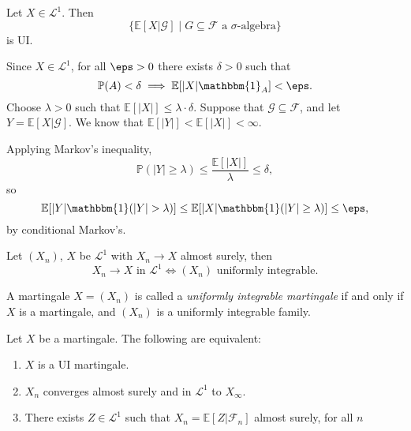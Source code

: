 \documentclass[12pt]{article}
\begin{document}
\begin{theorem}
	Let $X \in \mathcal{L}^1$. Then
	\[
		\{\mathbb{E}[X | \mathcal{G}] \mid G \subseteq \mathcal{F} \text{ a $\sigma$-algebra}\}
	\]
	is UI.
\end{theorem}

\begin{proofbox}
	Since $X \in \mathcal{L}^1$, for all $\eps > 0$ there exists $\delta > 0$ such that
	\[
	\mathbb{P}(A) < \delta \implies \mathbb{E}[|X| \mathbbm{1}_{A}] < \eps.
	\]
	Choose $\lambda > 0$ such that $\mathbb{E}[|X|] \leq \lambda \cdot \delta$. Suppose that $\mathcal{G} \subseteq \mathcal{F}$, and let $Y = \mathbb{E}[X|\mathcal{G}]$. We know that $\mathbb{E}[|Y|] < \mathbb{E}[|X|] < \infty$.

	Applying Markov's inequality,
	\[
	\mathbb{P}(|Y| \geq \lambda) \leq \frac{\mathbb{E}[|X|]}{\lambda} \leq \delta,
	\]
	so
	\[
	\mathbb{E}[|Y| \mathbbm{1}(|Y| > \lambda)] \leq \mathbb{E}[|X| \mathbbm{1}(|Y| \geq \lambda)] \leq \eps,
	\]
	by conditional Markov's.
\end{proofbox}


\begin{lemma}
	Let $(X_n)$, $X$ be $\mathcal{L}^1$ with $X_n \to X$ almost surely, then
	\[
		X_n \to X \text{ in } \mathcal{L^1} \iff (X_n) \text{ uniformly integrable}.
	\]
\end{lemma}

\begin{definition}
	A martingale $X = (X_n)$ is called a \emph{uniformly integrable martingale} if and only if $X$ is a martingale, and $(X_n)$ is a uniformly integrable family.
\end{definition}

\begin{theorem}
	Let $X$ be a martingale. The following are equivalent:
	\begin{enumerate}[\normalfont(i)]
		\item $X$ is a UI martingale.
		\item $X_n$ converges almost surely and in $\mathcal{L}^1$ to $X_\infty$.
		\item There exists $Z \in \mathcal{L}^1$ such that $X_n = \mathbb{E}[Z | \mathcal{F}_n]$ almost surely, for all $n$
	\end{enumerate}
\end{theorem}
\end{document}

